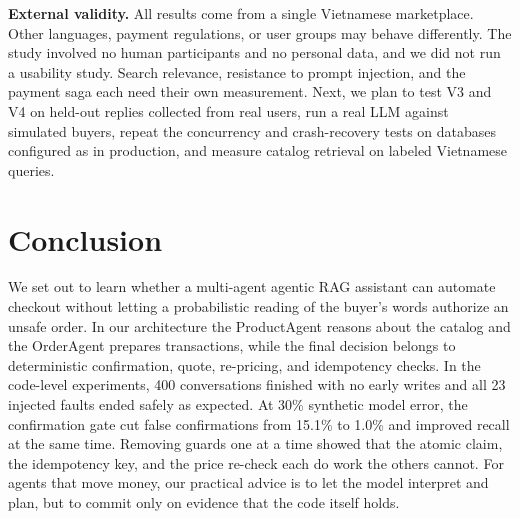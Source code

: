 \documentclass{IEEEtran}
\begin{document}
\textbf{External validity.} All results come from a single Vietnamese marketplace. Other languages, payment regulations, or user groups may behave differently. The study involved no human participants and no personal data, and we did not run a usability study. Search relevance, resistance to prompt injection, and the payment saga each need their own measurement. Next, we plan to test V3 and V4 on held-out replies collected from real users, run a real LLM against simulated buyers, repeat the concurrency and crash-recovery tests on databases configured as in production, and measure catalog retrieval on labeled Vietnamese queries.

\section{Conclusion}

We set out to learn whether a multi-agent agentic RAG assistant can automate checkout without letting a probabilistic reading of the buyer's words authorize an unsafe order. In our architecture the ProductAgent reasons about the catalog and the OrderAgent prepares transactions, while the final decision belongs to deterministic confirmation, quote, re-pricing, and idempotency checks. In the code-level experiments, 400 conversations finished with no early writes and all 23 injected faults ended safely as expected. At 30\% synthetic model error, the confirmation gate cut false confirmations from 15.1\% to 1.0\% and improved recall at the same time. Removing guards one at a time showed that the atomic claim, the idempotency key, and the price re-check each do work the others cannot. For agents that move money, our practical advice is to let the model interpret and plan, but to commit only on evidence that the code itself holds.

\end{document}
